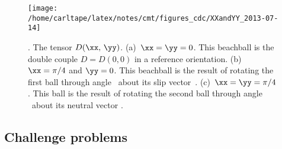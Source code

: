 \documentclass[11pt,titlepage,fleqn]{article}
\newcommand{\fvecb}{\textcolor{blue}{\mbB}}
\newcommand{\fvecs}{\mbS}
\begin{document}
\begin{figure}[h]
\center
\texttt{[image: /home/carltape/latex/notes/cmt/figures\_cdc/XXandYY\_2013-07-14]}
\caption{
\citep[Figure~8 of][]{TapeTape2013}. The tensor $D(\xx,\,\yy)$.
(a)~$\xx=\yy=0$. This beachball is the double couple $D=D(0,0)$ in a reference orientation.
(b)~$\xx=\pi/4$ and $\yy=0$. This beachball is the result of rotating the first ball through angle \xx\ about its slip vector~\fvecs.
(c)~$\xx=\yy=\pi/4$. This ball is the result of rotating the second ball through angle \yy\ about its neutral vector \fvecb.
\label{fig:XXandYY}
}
\end{figure}


\pagebreak
\subsection*{Challenge problems}

\renewcommand{\theenumi}{C\arabic{enumi}}
\end{document}
